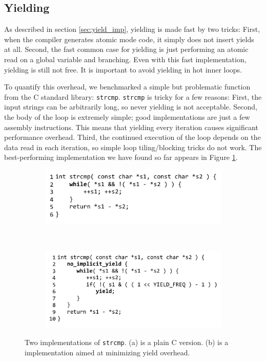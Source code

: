 \documentclass[9pt,preprint]{sigplanconf}
\begin{document}
\subsection{Yielding}

As described in section \ref{sec:yield_imp}, yielding is made fast by two tricks:
First, when the compiler generates atomic mode code, it simply does not insert yields at all.
Second, the fast common case for yielding is just performing an atomic read on a global variable and branching.
Even with this fast implementation, yielding is still not free.
It is important to avoid yielding in hot inner loops.

To quantify this overhead, we benchmarked a simple but problematic function from the C standard library: \texttt{strcmp}.
\texttt{strcmp} is tricky for a few reasons:
First, the input strings can be arbitrarily long, so never yielding is not acceptable.
Second, the body of the loop is extremely simple; good implementations are just a few assembly instructions.
This means that yielding every iteration causes significant performance overhead.
Third, the continued execution of the loop depends on the data read in each iteration, so simple loop tiling/blocking tricks do not work.
The best-performing implementation we have found so far appears in Figure \ref{fig:strcmp}.

\begin{figure}
    \centering
    \begin{subfigure}[b]{0.3\textwidth}
        \hspace{-1.5cm}
        \includegraphics{plain_strcmp}
        \caption{}
    \end{subfigure}
    ~ %
    \begin{subfigure}[b]{0.3\textwidth}
        \hspace{-1.5cm}
        \includegraphics{strcmp_benchmark}
        \caption{}
    \end{subfigure}
    \caption{Two implementations of \texttt{strcmp}.
      (a) is a plain C version.
      (b) is a \charcoal{} implementation aimed at minimizing yield overhead. }
    \label{fig:strcmp}
\end{figure}
\end{document}
